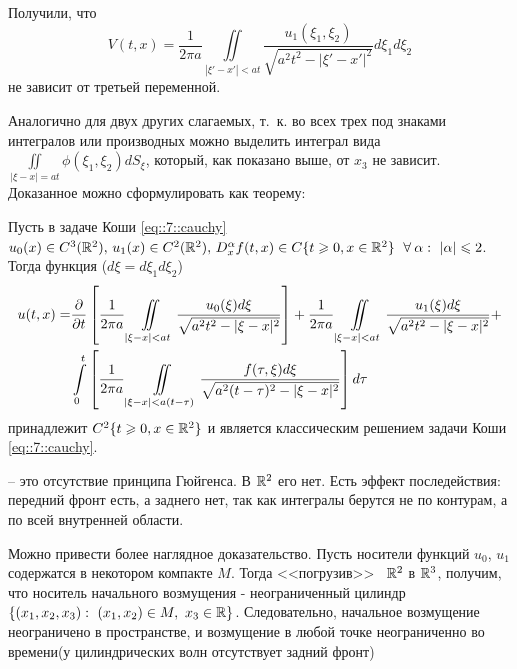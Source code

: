 Получили, что 
\[
V(t, x)=\frac{1}{2\pi a}\iint\limits_{|\xi' -x'|<at}\frac{u_1(\xi_1, \xi_2)}{\sqrt{a^2t^2-|\xi' -x'|^2}}d\xi_1d\xi_2
\]
не зависит от третьей переменной. 

Аналогично для двух других слагаемых, т.~к. во всех трех под знаками интегралов или производных можно выделить интеграл вида $\displaystyle\iint\limits_{|\xi -x|=at}\phi (\xi_1, \xi_2)dS_{\xi}$, который, как показано выше, от $x_3$ не зависит. Доказанное можно сформулировать как теорему:
\begin{theorem}
Пусть в задаче Коши \eqref{eq::7::cauchy} $u_0(x)\in C^3(\R^2),\, u_1(x)\in C^2(\R^2),\, D_x^{\alpha}f(t,x)\in C\{t\geq 0, x\in\R^2\}\ \forall\alpha :\ |\alpha |\leq 2$. Тогда функция ($d\xi =d\xi_1d\xi_2$)
\[
\begin{split}
u(t, x)=&\frac{\partial }{\partial t}\left[\frac{1}{2\pi a}\iint\limits_{|\xi - x|<at}\frac{u_0(\xi )d\xi}{\sqrt{a^2t^2-|\xi - x|^2}} \right]+ \frac{1}{2\pi a}\iint\limits_{|\xi - x|<at}\frac{u_1(\xi )d\xi}{\sqrt{a^2t^2-|\xi - x|^2}}+\\
&\int\limits_0^t\left[\frac{1}{2\pi a}\iint\limits_{|\xi - x|<a(t-\tau )}\frac{f(\tau ,\xi )d\xi}{\sqrt{a^2(t-\tau )^2-|\xi - x|^2}} \right]d\tau
\end{split}
\]
принадлежит $C^2\{t\geqslant 0, x\in\mathbb{R}^2 \}$ и является классическим решением задачи Коши \eqref{eq::7::cauchy}.
\end{theorem}
\begin{definition}
-- это отсутствие принципа Гюйгенса. В $\mathbb{R}^2$ его нет. Есть эффект последействия: передний фронт есть, а заднего нет, так как интегралы берутся не по контурам, а по всей внутренней области.
\end{definition}
Можно привести более наглядное доказательство. Пусть носители функций $u_0$, $u_1$ содержатся в некотором компакте $M$. Тогда <<погрузив>>~ $\mathbb{R}^2$ в $\mathbb{R}^3$, получим, что носитель начального возмущения - неограниченный цилиндр $\{(x_1, x_2, x_3): ~(x_1, x_2) \in M,~ x_3 \in \mathbb{R} \}$. Следовательно, начальное возмущение неограничено в пространстве, и возмущение в любой точке неограниченно во времени(у цилиндрических волн отсутствует задний фронт)








